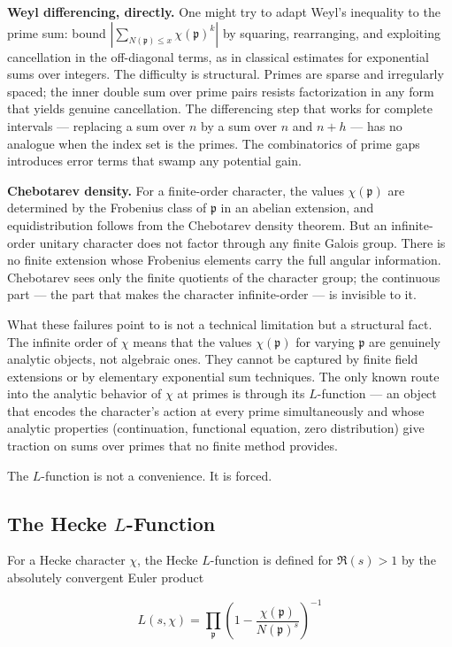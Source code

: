 \documentclass[12pt,a4paper]{article}
\begin{document}
\textbf{Weyl differencing, directly.} One might try to adapt Weyl's inequality to the prime sum: bound $|\sum_{N(\mathfrak{p}) \leq x} \chi(\mathfrak{p})^k|$ by squaring, rearranging, and exploiting cancellation in the off-diagonal terms, as in classical estimates for exponential sums over integers. The difficulty is structural. Primes are sparse and irregularly spaced; the inner double sum over prime pairs resists factorization in any form that yields genuine cancellation. The differencing step that works for complete intervals --- replacing a sum over $n$ by a sum over $n$ and $n+h$ --- has no analogue when the index set is the primes. The combinatorics of prime gaps introduces error terms that swamp any potential gain.

\textbf{Chebotarev density.} For a finite-order character, the values $\chi(\mathfrak{p})$ are determined by the Frobenius class of $\mathfrak{p}$ in an abelian extension, and equidistribution follows from the Chebotarev density theorem. But an infinite-order unitary character does not factor through any finite Galois group. There is no finite extension whose Frobenius elements carry the full angular information. Chebotarev sees only the finite quotients of the character group; the continuous part --- the part that makes the character infinite-order --- is invisible to it.

What these failures point to is not a technical limitation but a structural fact. The infinite order of $\chi$ means that the values $\chi(\mathfrak{p})$ for varying $\mathfrak{p}$ are genuinely analytic objects, not algebraic ones. They cannot be captured by finite field extensions or by elementary exponential sum techniques. The only known route into the analytic behavior of $\chi$ at primes is through its $L$-function --- an object that encodes the character's action at every prime simultaneously and whose analytic properties (continuation, functional equation, zero distribution) give traction on sums over primes that no finite method provides.

The $L$-function is not a convenience. It is forced.

\subsection{The Hecke $L$-Function}

For a Hecke character $\chi$, the Hecke $L$-function is defined for $\Re(s) > 1$ by the absolutely convergent Euler product

\[
L(s, \chi) = \prod_{\mathfrak{p}} \left(1 - \frac{\chi(\mathfrak{p})}{N(\mathfrak{p})^s}\right)^{-1}
\]
\end{document}
